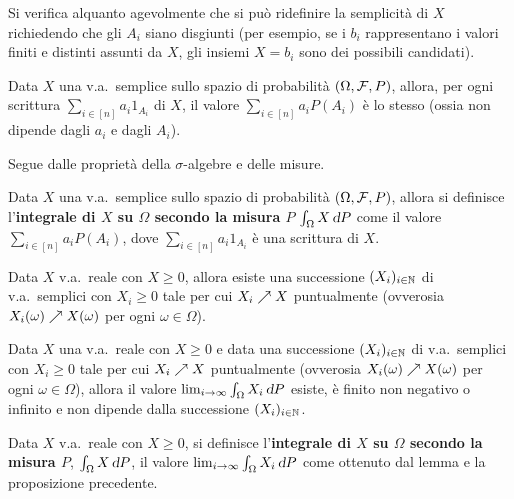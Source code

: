 \begin{multicols*}{2}
\begin{remark}
    Si verifica alquanto agevolmente che si può ridefinire la
    semplicità di $X$ richiedendo che gli $A_i$ siano
    disgiunti (per esempio, se i $b_i$ rappresentano i valori finiti
    e distinti assunti da $X$, gli insiemi $X = b_i$ sono dei possibili
    candidati).
\end{remark}

\begin{proposition}
    Data $X$ una v.a.~semplice sullo spazio di probabilità
    $(\Omega, \mathcal{F}, P)$, allora, per ogni scrittura $\sum_{i \in [n]} a_i 1_{A_i}$ di $X$,
    il valore $\sum_{i \in [n]} a_i P(A_i)$ è lo stesso (ossia non dipende dagli
    $a_i$ e dagli $A_i$). \smallskip


    Segue dalle proprietà della $\sigma$-algebre e delle misure.
\end{proposition}

\begin{definition}
    Data $X$ una v.a.~semplice sullo spazio di probabilità
    $(\Omega, \mathcal{F}, P)$, allora si definisce l'\textbf{integrale di $X$ su
    $\Omega$ secondo la misura $P$}
    $\int_\Omega X \dP$ come il valore $\sum_{i \in [n]} a_i P(A_i)$, dove
    $\sum_{i \in [n]} a_i 1_{A_i}$ è una scrittura di $X$.
\end{definition}

\begin{lemma}
    Data $X$ v.a.~reale con $X \geq 0$, allora esiste una successione $(X_i)_{i \in \mathbb{N}}$ di
    v.a.~semplici con $X_i \geq 0$ tale per cui $X_i \nearrow X$ puntualmente (ovverosia
    $X_i(\omega) \nearrow X(\omega)$ per ogni $\omega \in \Omega$).
\end{lemma}

\begin{proposition}
    Data $X$ una v.a.~reale con $X \geq 0$ e data una successione $(X_i)_{i \in \mathbb{N}}$ di
    v.a.~semplici con $X_i \geq 0$ tale per cui $X_i \nearrow X$ puntualmente (ovverosia
    $X_i(\omega) \nearrow X(\omega)$ per ogni $\omega \in \Omega$), allora il
    valore $\lim_{i \to \infty} \int_\Omega X_i \dP$ esiste, è finito non negativo o infinito e
    non dipende dalla successione $(X_i)_{i \in \mathbb{N}}$.
\end{proposition}

\begin{definition}
    Data $X$ v.a.~reale con $X \geq 0$, si definisce l'\textbf{integrale di $X$
    su $\Omega$ secondo la misura $P$},
    $\int_\Omega X \dP$, il valore $\lim_{i \to \infty} \int_\Omega X_i \dP$ come
    ottenuto dal lemma e la proposizione precedente.
\end{definition}


\end{multicols*}
